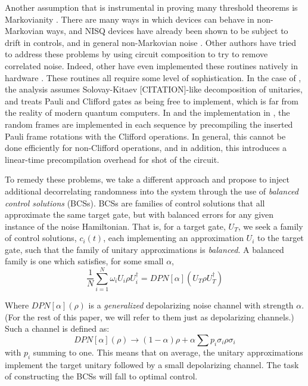 \documentclass[aps,nofootinbib,pra,notitlepage,twocolumn]{revtex4-1}
\begin{document}
Another assumption that is instrumental in proving many threshold theorems is Markovianity \cite{Kitaev1997}. There are many ways in which devices can behave in non-Markovian ways, and NISQ devices have already been shown to be subject to drift in controls, \cite{Kelly2018} and in general non-Markovian noise \cite{BlumeKohout2017}. Other authors have tried to address these problems \cite{Wallman2016, Campbell2017, Heim2016} by using circuit composition to try to remove correlated noise. Indeed, other have even implemented these routines natively in hardware \cite{Ware2018}. These routines all require some level of sophistication. In the case of \cite{Campbell2017}, the analysis assumes Solovay-Kitaev [CITATION]-like decomposition of unitaries, and treats Pauli and Clifford gates as being free to implement, which is far from the reality of modern quantum computers. In \cite{Wallman2016} and the implementation in \cite{Ware2018}, the random frames are implemented in each sequence by precompiling the inserted Pauli frame rotations with the Clifford operations. In general, this cannot be done efficiently for non-Clifford operations, and in addition, this introduces a linear-time precompilation overhead for shot of the circuit.

To remedy these problems, we take a different approach and propose to inject additional decorrelating randomness into the system through the use of \emph{balanced control solutions} (BCSs). BCSs are families of control solutions that all approximate the same target gate, but with balanced errors for any given instance of the noise Hamiltonian. That is, for a target gate, $U_T$, we seek a family of control solutions, $c_i(t)$, each implementing an approximation $U_i$ to the target gate, such that the family of unitary approximations is \emph{balanced}. A balanced family is one which satisfies, for some small $\alpha$,
\begin{equation}\label{eq:1}
  \frac{1}{N}\sum_{i=1}^N \omega_i U_i \rho U_i^\dagger = DPN[\alpha]\left(U_T \rho U_T^\dagger \right)
\end{equation}

Where $DPN[\alpha](\rho)$ is a \textit{generalized} depolarizing noise channel with strength $\alpha$. (For the rest of this paper, we will refer to them just as depolarizing channels.) Such a channel is defined as:
\begin{equation}\label{eq:2}
  DPN[\alpha](\rho) \rightarrow (1-\alpha)\rho + \alpha\sum p_i \sigma_i\rho\sigma_i
\end{equation}
with $p_i$ summing to one. This means that on average, the unitary approximations implement the target unitary followed by a small depolarizing channel. The task of constructing the BCSs will fall to optimal control.
\end{document}
